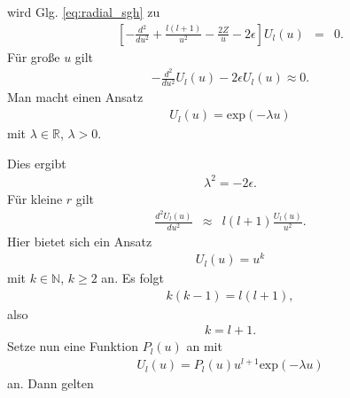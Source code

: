 \documentclass{book}
\renewcommand{\exp}{\text{exp}}
\begin{document}
%
wird Glg. \eqref{eq:radial_sgh} zu
%
\begin{eqnarray}
\left[-\frac{d^2}{du^2} + \frac{l\left(l + 1\right)}{u^2} - \frac{2Z}{u} - 2\epsilon\right]U_l\left(u\right) & = & 0.\label{eq:radial_seq_rescaled}
\end{eqnarray}
%
Für große $u$ gilt
%
\begin{eqnarray}
- \frac{d^2}{du^2}U_l\left(u\right) - 2\epsilon U_l\left(u\right)\approx 0.
\end{eqnarray}
%
Man macht einen Ansatz
%
\begin{eqnarray}
U_l\left(u\right) = \exp\left(-\lambda u\right)
\end{eqnarray}
%
mit $\lambda\in\mathbb{R}$, $\lambda >0$.

Dies ergibt
%
\begin{eqnarray}
\lambda^2 = -2\epsilon.\label{eq:energy_radial_sg}
\end{eqnarray}
%
Für kleine $r$ gilt
%
\begin{eqnarray}
\frac{d^2U_l\left(u\right)}{du^2}&\approx&l\left(l + 1\right)\frac{U_l\left(u\right)}{u^2}.
\end{eqnarray}
%
Hier bietet sich ein Ansatz
%
\begin{eqnarray}
U_l\left(u\right) = u^k
\end{eqnarray}
%
mit $k\in\mathbb{N}$, $k\geq 2$ an. Es folgt
%
\begin{eqnarray}
k\left(k - 1\right) = l\left(l + 1\right), 
\end{eqnarray}
%
also
%
\begin{eqnarray}
k = l + 1.
\end{eqnarray}
%
Setze nun eine Funktion $P_l\left(u\right)$ an mit
%
\begin{eqnarray}
U_l\left(u\right) = P_l\left(u\right)u^{l + 1}\exp\left(-\lambda u\right)
\end{eqnarray}
%
an. Dann gelten
%
\end{document}
